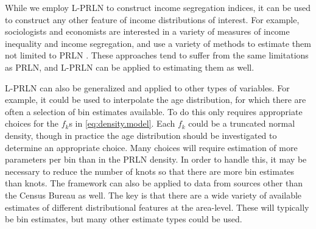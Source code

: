 \documentclass[12pt]{article}
\begin{document}
While we employ L-PRLN to construct income segregation indices, it can be used to construct any other feature of income distributions of interest. For example, sociologists and economists are interested in a variety of measures of income inequality and income segregation, and use a variety of methods to estimate them not limited to PRLN \citep{kennedy1996income,jargowsky1996take,mayer2001growth,hardman2004neighbors,watson2009inequality}. These approaches tend to suffer from the same limitations as PRLN, and  L-PRLN can be applied to estimating them as well.

L-PRLN can also be generalized and applied to other types of variables. For example, it could be used to interpolate the age distribution, for which there are often a selection of bin estimates available. To do this only requires appropriate choices for the $f_k$s in \eqref{eq:density.model}. Each $f_k$ could be a truncated normal density, though in practice the age distribution should be investigated to determine an appropriate choice. Many choices will require estimation of more parameters per bin than in the PRLN density. In order to handle this, it may be necessary to reduce the number of knots so that there are more bin estimates than knots. The framework can also be applied to data from sources other than the Census Bureau as well. The key is that there are a wide variety of available estimates of different distributional features at the area-level. These will typically be bin estimates, but many other estimate types could be used.
\end{document}
